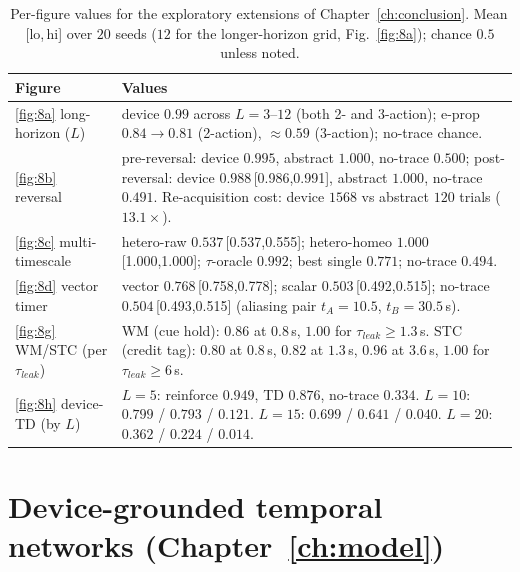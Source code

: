 \begin{table}[H]
    \caption[Source data: Chapter~\ref{ch:conclusion} extensions
    (Figs.~\ref{fig:8a}--\ref{fig:8h}).]{Per-figure values for the exploratory
    extensions of Chapter~\ref{ch:conclusion}. Mean\,[lo,\,hi] over $20$ seeds
    ($12$ for the longer-horizon grid, Fig.~\ref{fig:8a}); chance $0.5$ unless noted.}
    \begin{center}
    \footnotesize
    \begin{tabularx}{\textwidth}{@{}l X@{}}
    \toprule
    Figure & Values \\
    \midrule
    \ref{fig:8a} long-horizon ($L$) & device $0.99$ across $L{=}3$--$12$ (both 2- and 3-action); e-prop $0.84{\to}0.81$ (2-action), $\approx0.59$ (3-action); no-trace chance. \\
    \addlinespace
    \ref{fig:8b} reversal & pre-reversal: device $0.995$, abstract $1.000$, no-trace $0.500$; post-reversal: device $0.988$\,\tiny[0.986,0.991], abstract $1.000$, no-trace $0.491$. Re-acquisition cost: device $1568$ vs abstract $120$ trials ($13.1\times$). \\
    \addlinespace
    \ref{fig:8c} multi-timescale & hetero-raw $0.537$\,\tiny[0.537,0.555]; hetero-homeo $1.000$\,\tiny[1.000,1.000]; $\tau$-oracle $0.992$; best single $0.771$; no-trace $0.494$. \\
    \addlinespace
    \ref{fig:8d} vector timer & vector $0.768$\,\tiny[0.758,0.778]; scalar $0.503$\,\tiny[0.492,0.515]; no-trace $0.504$\,\tiny[0.493,0.515] (aliasing pair $t_A{=}10.5$, $t_B{=}30.5$\,s). \\
    \addlinespace
    \ref{fig:8g} WM/STC (per $\tau_{leak}$) & WM (cue hold): $0.86$ at $0.8$\,s, $1.00$ for $\tau_{leak}\ge1.3$\,s. STC (credit tag): $0.80$ at $0.8$\,s, $0.82$ at $1.3$\,s, $0.96$ at $3.6$\,s, $1.00$ for $\tau_{leak}\ge6$\,s. \\
    \addlinespace
    \ref{fig:8h} device-TD (by $L$) & $L{=}5$: reinforce $0.949$, TD $0.876$, no-trace $0.334$. $L{=}10$: $0.799$ / $0.793$ / $0.121$. $L{=}15$: $0.699$ / $0.641$ / $0.040$. $L{=}20$: $0.362$ / $0.224$ / $0.014$. \\
    \bottomrule
    \end{tabularx}
    \label{table:E10}
    \end{center}
    \vspace*{-\baselineskip}
\end{table}

\section{Device-grounded temporal networks (Chapter~\ref{ch:model})}

